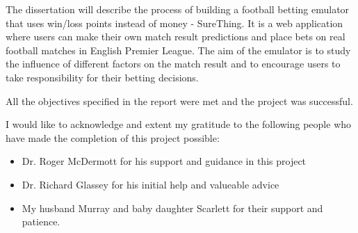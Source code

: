 \beforeabstract
{}
The dissertation will describe the process of building a football betting emulator that uses win/loss points instead of money - SureThing. It is a web application where users can make their own match result predictions and place bets on real football matches in English Premier League. The aim of the emulator is to study the influence of different factors on the match result and to encourage users to take responsibility for their betting decisions.

All the objectives specified in the report were met and the project was successful.

I would like to acknowledge and extent my gratitude to the following people who have made the completion of this project possible:

\begin{itemize}
	 \item Dr. Roger McDermott for his support and guidance in this project
	 \item Dr. Richard Glassey for his initial help and valueable advice
	 \item My husband Murray and baby daughter Scarlett for their support and patience.
 \end{itemize}

\afterpreface 
\afterabstract
